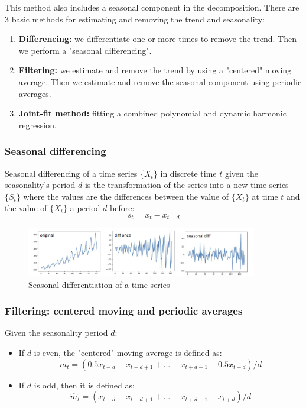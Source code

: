 This method also includes a seasonal component in the decomposition. There are
3 basic methods for estimating and removing the trend and seasonality:

\begin{enumerate}
    \item \textbf{Differencing:} we differentiate one or more times to remove the
    trend. Then we perform a "seasonal differencing".

    \item \textbf{Filtering:} we estimate and remove the trend by using a "centered"
    moving average. Then we estimate and remove the seasonal component using periodic
    averages.

    \item \textbf{Joint-fit method:} fitting a combined polynomial and dynamic harmonic
    regression.
\end{enumerate}

\subsubsection{Seasonal differencing}

Seasonal differencing of a time series $\{X_t\}$ in discrete time $t$ given the
seasonality's period $d$ is the transformation of the series into a new time series
$\{S_t\}$ where the values are the differences between the value of $\{X_t\}$ at time
$t$ and the value of $\{X_t\}$ a period $d$ before:
$$s_t = x_t - x_{t-d}$$

\begin{figure}[H]
    \centering
    \includegraphics[width=0.9\textwidth]{figures/seasonal_diff.png}
    \caption{Seasonal differentiation of a time series}
    \label{fig:season_diff}
\end{figure}

\subsubsection{Filtering: centered moving and periodic averages}

Given the seasonality period $d$:
\begin{itemize}
    \item If $d$ is even, the "centered" moving average is defined as:
    $$\hat{m}_t = (0.5 x_{t-d} + x_{t-d+1} + ... + x_{t+d - 1} + 0.5 x_{t+d}) / d$$

    \item If $d$ is odd, then it is defined as:
    $$\hat{m}_t = (x_{t-d} + x_{t-d+1} + ... + x_{t+d - 1} + x_{t+d}) / d$$
\end{itemize}

